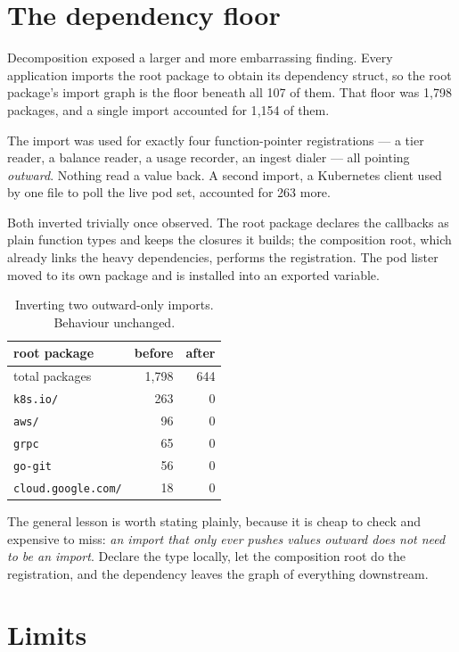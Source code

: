 \documentclass[11pt]{article}
\begin{document}
\section{The dependency floor}

Decomposition exposed a larger and more embarrassing finding. Every application
imports the root package to obtain its dependency struct, so the root package's
import graph is the floor beneath all 107 of them. That floor was 1{,}798
packages, and a single import accounted for 1{,}154 of them.

The import was used for exactly four function-pointer registrations --- a tier
reader, a balance reader, a usage recorder, an ingest dialer --- all pointing
\emph{outward}. Nothing read a value back. A second import, a Kubernetes client
used by one file to poll the live pod set, accounted for 263 more.

Both inverted trivially once observed. The root package declares the callbacks
as plain function types and keeps the closures it builds; the composition root,
which already links the heavy dependencies, performs the registration. The pod
lister moved to its own package and is installed into an exported variable.

\begin{table}[h]
\centering
\begin{tabular}{lrr}
\toprule
\textbf{root package} & \textbf{before} & \textbf{after} \\
\midrule
total packages     & 1{,}798 & 644 \\
\texttt{k8s.io/}   & 263 & 0 \\
\texttt{aws/}      & 96  & 0 \\
\texttt{grpc}      & 65  & 0 \\
\texttt{go-git}    & 56  & 0 \\
\texttt{cloud.google.com/} & 18 & 0 \\
\bottomrule
\end{tabular}
\caption{Inverting two outward-only imports. Behaviour unchanged.}
\label{tab:floor}
\end{table}

The general lesson is worth stating plainly, because it is cheap to check and
expensive to miss: \emph{an import that only ever pushes values outward does not
need to be an import}. Declare the type locally, let the composition root do the
registration, and the dependency leaves the graph of everything downstream.

\section{Limits}
\end{document}
